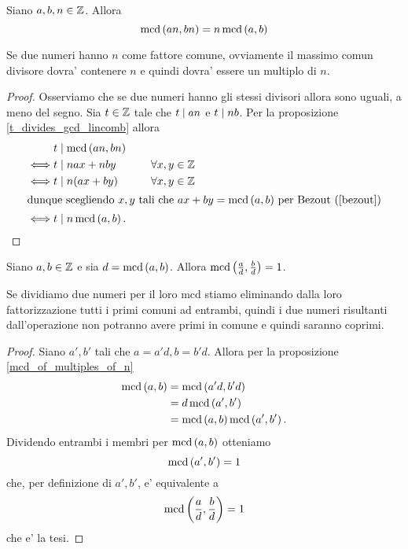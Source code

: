\begin{proposition} \label{mcd_of_multiples_of_n}
    Siano $a, b, n \in \mathbb{Z}$. Allora \begin{equation}
        \operatorname{mcd}\left(an, bn\right) = n\operatorname{mcd}\left(a, b\right)
    \end{equation}
\end{proposition}
\begin{intuition}
    Se due numeri hanno $n$ come fattore comune, ovviamente il massimo comun divisore dovra' contenere $n$ e quindi dovra' essere un multiplo di $n$.
\end{intuition}
\begin{proof}
    Osserviamo che se due numeri hanno gli stessi divisori allora sono uguali, a meno del segno.
    Sia $t \in \mathbb{Z}$ tale che $t \mid an$ e $t \mid nb$. Per la proposizione \ref{t_divides_gcd_lincomb} allora 
    \begin{alignat*}
        {2}
        &t \mid \operatorname{mcd}\left(an, bn\right)\\
        \iff &t \mid nax + nby      \qquad& \forall x, y \in \mathbb{Z} \\
        \iff &t \mid n(ax + by)     \qquad& \forall x, y \in \mathbb{Z} \\
        \intertext{dunque scegliendo $x, y$ tali che $ax+by = \operatorname{mcd}\left(a, b\right)$ per Bezout (\ref{bezout})}
        \iff &t \mid n\operatorname{mcd}\left(a, b\right).
    \end{alignat*}
\end{proof}


\begin{corollary} \label{mcd_diviso_mcd}
    Siano $a, b \in \mathbb{Z}$ e sia $d = \operatorname{mcd}\left(a, b\right)$. Allora $\operatorname{mcd}\left(\frac{a}{d}, \frac{b}{d}\right) = 1$.
\end{corollary}
\begin{intuition}
    Se dividiamo due numeri per il loro mcd stiamo eliminando dalla loro fattorizzazione tutti i primi comuni ad entrambi, quindi i due numeri risultanti dall'operazione non potranno avere primi in comune e quindi saranno coprimi.
\end{intuition}
\begin{proof}
    Siano $a', b'$ tali che $a = a'd, b = b'd$. Allora per la proposizione \ref{mcd_of_multiples_of_n}
    \begin{alignat*}{1}
        \operatorname{mcd}\left(a, b\right) &= \operatorname{mcd}\left(a'd, b'd\right) \\
                   &= d\operatorname{mcd}\left(a', b'\right) \\
                   &= \operatorname{mcd}\left(a, b\right) \operatorname{mcd}\left(a', b'\right).
        \end{alignat*} 
    Dividendo entrambi i membri per $\operatorname{mcd}\left(a, b\right)$ otteniamo \[
        \operatorname{mcd}\left(a', b'\right) = 1 
    \]
    che, per definizione di $a', b'$, e' equivalente a \[
        \operatorname{mcd}\left(\frac{a}{d}, \frac{b}{d}\right) = 1
    \]
    che e' la tesi.
\end{proof}




